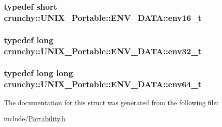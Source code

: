 \subsubsection[{env16\+\_\+t}]{\setlength{\rightskip}{0pt plus 5cm}typedef short {\bf crunchy\+::\+U\+N\+I\+X\+\_\+\+Portable\+::\+E\+N\+V\+\_\+\+D\+A\+T\+A\+::env16\+\_\+t}}\label{structcrunchy_1_1_u_n_i_x___portable_1_1_e_n_v___d_a_t_a_ad0f7a36599aa831e6f0186d0eab41e69}
\hypertarget{structcrunchy_1_1_u_n_i_x___portable_1_1_e_n_v___d_a_t_a_ad3928f01a5462ef0064f802ab3b2d8a9}{}
\subsubsection[{env32\+\_\+t}]{\setlength{\rightskip}{0pt plus 5cm}typedef long {\bf crunchy\+::\+U\+N\+I\+X\+\_\+\+Portable\+::\+E\+N\+V\+\_\+\+D\+A\+T\+A\+::env32\+\_\+t}}\label{structcrunchy_1_1_u_n_i_x___portable_1_1_e_n_v___d_a_t_a_ad3928f01a5462ef0064f802ab3b2d8a9}
\hypertarget{structcrunchy_1_1_u_n_i_x___portable_1_1_e_n_v___d_a_t_a_acf3a73691f8290fd4c537863eb566167}{}
\subsubsection[{env64\+\_\+t}]{\setlength{\rightskip}{0pt plus 5cm}typedef long long {\bf crunchy\+::\+U\+N\+I\+X\+\_\+\+Portable\+::\+E\+N\+V\+\_\+\+D\+A\+T\+A\+::env64\+\_\+t}}\label{structcrunchy_1_1_u_n_i_x___portable_1_1_e_n_v___d_a_t_a_acf3a73691f8290fd4c537863eb566167}


The documentation for this struct was generated from the following file\+:\begin{DoxyCompactItemize}
\item 
include/\hyperlink{_portability_8h}{Portability.\+h}\end{DoxyCompactItemize}
